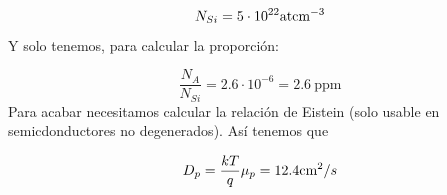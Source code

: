 \begin{texercise}
\begin{enumerate}[label=\alph*)]
		\begin{equation}
			N_{Si} = 5 \cdot 10^{22} \text{at} \text{cm}^{-3}
		\end{equation}
		Y solo tenemos, para calcular la proporción:

		\begin{equation}
			\frac{N_A}{N_{Si}} = 2.6 \cdot 10^{-6} = 2.6 \ \text{ppm}
		\end{equation}
		Para acabar necesitamos calcular la relación de Eistein (solo usable en semicdonductores no degenerados). Así tenemos que 

		\begin{equation}
			D_p = \frac{kT}{q} \mu_p = 12.4 \text{cm}^2 / s
		\end{equation}
	\end{enumerate}
	
\end{texercise}

